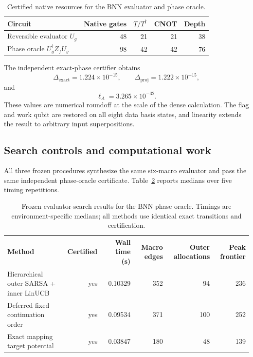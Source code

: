 \begin{table}[t]
\caption{Certified native resources for the BNN evaluator and phase oracle.}
\label{tab:oracle-resources}
\centering
\begin{tabular}{lrrrr}
\toprule
Circuit & Native gates & $T/T^\dagger$ & CNOT & Depth\\
\midrule
Reversible evaluator $U_g$ & 48 & 21 & 21 & 38\\
Phase oracle $U_g^\dagger Z_fU_g$ & 98 & 42 & 42 & 76\\
\bottomrule
\end{tabular}
\end{table}

The independent exact-phase certifier obtains
\begin{equation}
\Delta_{\mathrm{exact}}=1.224\times10^{-15},
\qquad
\Delta_{\mathrm{proj}}=1.222\times10^{-15},
\end{equation}
and
\begin{equation}
\ell_A=3.265\times10^{-32}.
\end{equation}
These values are numerical roundoff at the scale of the dense calculation.  The flag and work qubit are restored on all eight data basis states, and linearity extends the result to arbitrary input superpositions.

\subsection{Search controls and computational work}

All three frozen procedures synthesize the same six-macro evaluator and pass the same independent phase-oracle certificate.  Table~\ref{tab:oracle-controls} reports medians over five timing repetitions.

\begin{table}[t]
\caption{Frozen evaluator-search results for the BNN phase oracle.  Timings are environment-specific medians; all methods use identical exact transitions and certification.}
\label{tab:oracle-controls}
\centering
\begin{tabular}{lrrrrr}
\toprule
Method & Certified & Wall time (s) & Macro edges & Outer allocations & Peak frontier\\
\midrule
Hierarchical outer SARSA + inner LinUCB & yes & 0.10329 & 352 & 94 & 236\\
Deferred fixed continuation order & yes & 0.09534 & 371 & 100 & 252\\
Exact mapping target potential & yes & 0.03847 & 180 & 48 & 139\\
\bottomrule
\end{tabular}
\end{table}

